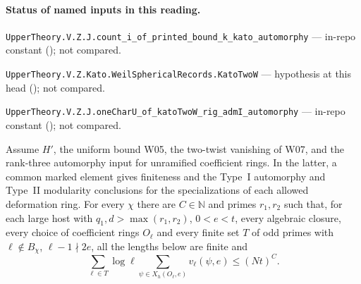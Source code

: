 

\paragraph{Status of named inputs in this reading.}
\noindent\nolinkurl{UpperTheory.V.Z.J.count_i_of_printed_bound_k_kato_automorphy} --- in-repo constant (); not compared.\par
\noindent\nolinkurl{UpperTheory.V.Z.Kato.WeilSphericalRecords.KatoTwoW} --- hypothesis at this head (); not compared.\par
\noindent\nolinkurl{UpperTheory.V.Z.J.oneCharU_of_katoTwoW_rig_admI_automorphy} --- in-repo constant (); not compared.\par

\begin{formalstatement}\label{sub:W08}
Assume $H'$, the uniform bound W05, the two-twist vanishing of W07,
and the rank-three automorphy input for unramified coefficient rings.
In the latter, a common marked element gives finiteness and the
Type~I automorphy and Type~II modularity conclusions for the
specializations of each allowed deformation ring. For every $\chi$
there are $C\in\mathbb N$ and primes $r_1,r_2$ such that, for each
large host with $q_1,d>\max(r_1,r_2)$, $0<e<t$, every algebraic
closure, every choice of coefficient rings $O_\ell$ and every finite
set $T$ of odd primes with $\ell\notin B_\chi$, $\ell-1\nmid2e$,
all the lengths below are finite and
\[
 \sum_{\ell\in T}\log\ell\!
       \sum_{\psi\in X_h(O_\ell,e)} v_\ell(\psi,e)\le (Nt)^C .
\]
\end{formalstatement}
